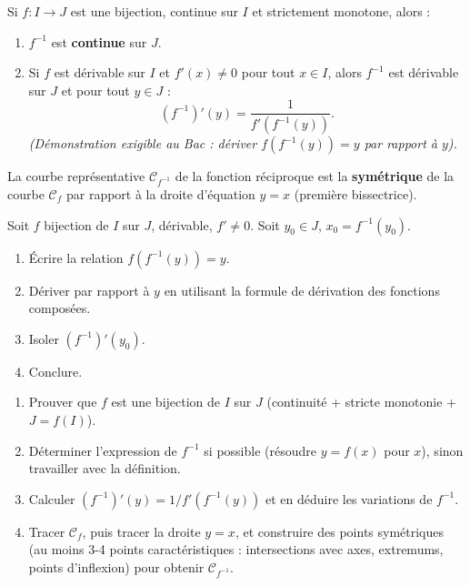 \documentclass[11pt]{article}
\begin{document}
\begin{propriete}
Si $f : I \to J$ est une bijection, continue sur $I$ et strictement monotone, alors :
\begin{enumerate}
  \item $f^{-1}$ est \textbf{continue} sur $J$.
  \item Si $f$ est dérivable sur $I$ et $f'(x) \neq 0$ pour tout $x \in I$, alors $f^{-1}$ est dérivable sur $J$ et pour tout $y \in J$ :
  \[
  \left(f^{-1}\right)'(y) = \frac{1}{f'\left(f^{-1}(y)\right)}.
  \]
  \emph{(Démonstration exigible au Bac : dériver $f(f^{-1}(y))=y$ par rapport à $y$).}
\end{enumerate}
\end{propriete}

\begin{propriete}
La courbe représentative $\mathcal{C}_{f^{-1}}$ de la fonction réciproque est la \textbf{symétrique} de la courbe $\mathcal{C}_f$ par rapport à la droite d'équation $y=x$ (première bissectrice).
\end{propriete}

\begin{experience}
Soit $f$ bijection de $I$ sur $J$, dérivable, $f' \neq 0$. Soit $y_0 \in J$, $x_0 = f^{-1}(y_0)$.
\begin{enumerate}
  \item Écrire la relation $f(f^{-1}(y)) = y$.
  \item Dériver par rapport à $y$ en utilisant la formule de dérivation des fonctions composées.
  \item Isoler $(f^{-1})'(y_0)$.
  \item Conclure.
\end{enumerate}
\end{experience}

\begin{methode}
\begin{enumerate}
  \item Prouver que $f$ est une bijection de $I$ sur $J$ (continuité + stricte monotonie + $J=f(I)$).
  \item Déterminer l'expression de $f^{-1}$ si possible (résoudre $y=f(x)$ pour $x$), sinon travailler avec la définition.
  \item Calculer $(f^{-1})'(y) = 1 / f'(f^{-1}(y))$ et en déduire les variations de $f^{-1}$.
  \item Tracer $\mathcal{C}_f$, puis tracer la droite $y=x$, et construire des points symétriques (au moins 3-4 points caractéristiques : intersections avec axes, extremums, points d'inflexion) pour obtenir $\mathcal{C}_{f^{-1}}$.
\end{enumerate}
\end{methode}
\end{document}
